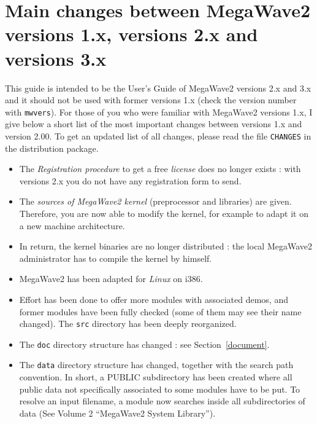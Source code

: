 \section{Main changes between MegaWave2 versions 1.x, versions 2.x and versions 3.x}
\label{intro_main_changes}

This guide is intended to be the User's Guide of MegaWave2 versions 2.x and 3.x and it 
should not be used with former versions 1.x (check the version number with \verb+mwvers+). 
For those of you who were familiar with MegaWave2 versions 1.x, I give below a short list of the most important changes
between versions 1.x and version 2.00. 
To get an updated list of all changes, please read the file \verb+CHANGES+ in the distribution
package.

\begin{itemize}
\item The {\em Registration procedure} to get a free {\em license} does no longer exists : with versions 2.x 
you do not have any registration form to send.
\item The {\em sources of MegaWave2 kernel} (preprocessor and libraries) are given. Therefore, you are now able to
modify the kernel, for example to adapt it on a new machine architecture.
\item In return, the kernel binaries are no longer distributed : the local MegaWave2 administrator has
to compile the kernel by himself.
\item MegaWave2 has been adapted for {\em Linux} on i386.
\item Effort has been done to offer more modules with associated demos, and former modules have been fully checked (some of them may see their name changed).
The \verb+src+ directory has been deeply reorganized.
\item The \verb+doc+ directory structure has changed : see Section~\ref{document}.
\item The \verb+data+ directory structure has changed, together with the search path convention.
In short, a PUBLIC subdirectory has been created where all public data not specifically associated 
to some modules have to be put. To resolve an input filename, a module now searches inside all 
subdirectories of data (See Volume 2 ``MegaWave2 System Library'').
\end{itemize}


